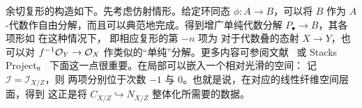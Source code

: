余切复形的构造如下。先考虑仿射情形。给定环同态 $\phi:A\to B$，可以将 $B$ 作为 $A$-代数作自由分解，而且可以典范地完成。得到增广单纯代数分解 $P_\bullet\to B$，其各项形如
在这种情况下，
即相应复形的第 $-n$ 项为
对于代数叠的态射 $X\to Y$，也可以对 $f^{-1}\mathcal O_Y\to\mathcal O_X$ 作类似的“单纯”分解。更多内容可参阅文献~\cite{ref19} 或 Stacks Project。
下面这一点很重要。在局部可以嵌入一个相对光滑的空间：
记 $\mathcal I=\mathcal I_{X/Z}$，则
两项分别位于次数 $-1$ 与 $0$。也就是说，在对应的线性纤维空间层面，得到
这正是将 $C_{X/Z}\hookrightarrow N_{X/Z}$ 整体化所需要的数据。
